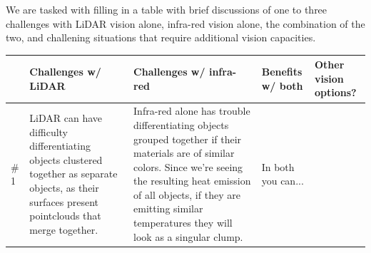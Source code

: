 \documentclass{article}
\begin{document}
We are tasked with filling in a table with brief discussions of one to three challenges with LiDAR vision alone, infra-red vision alone, the combination of the two, and challening situations that require additional vision capacities.

\begin{center}
    \begin{tabular}{| m{2em} | m{11em}| m{11em} | m{11em} | m{11em} |}
        \hline
        & Challenges w/ LiDAR & Challenges w/ infra-red  & Benefits w/ both & Other vision options? \\ 
        \hline
        \# 1 &
        LiDAR can have difficulty differentiating objects clustered together as separate objects, as their surfaces present pointclouds that merge together. &
        Infra-red alone has trouble differentiating objects grouped together if their materials are of similar colors. Since we're seeing the resulting heat emission of all objects, if they are emitting similar temperatures they will look as a singular clump. &
        In both you can... & 
        
        \\ 
        
        \hline
    \end{tabular}
\end{center}
\end{document}
